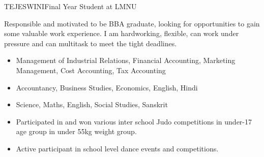 \documentclass{article}
\begin{document}
\begin{cv}[avatar]{TEJESWINI}{Final Year Student at LMNU}



Responsible and motivated to be BBA graduate, looking for opportunities to gain some valuable work experience.
I am hardworking, flexible, can work under pressure and can multitask to meet the tight deadlines. \\



\begin{cvevent}[2020][present]
    \begin{itemize}
    	\item{Management of Industrial Relations, Financial Accounting, Marketing Management, Cost Accounting, Tax Accounting\\}
    \end{itemize}
    \begin{itemize}
    \item{Accountancy, Business Studies, Economics, English, Hindi \\ }
	\end{itemize}
     \begin{itemize}
    \item{Science, Maths, English, Social Studies, Sanskrit\\}
	\end{itemize}

\end{cvevent}



\begin{cvevent}[2017][2018]
    \begin{itemize}
        \item Participated in and won various inter school Judo competitions in under-17 age group in under 55kg weight group.
    \end{itemize}
    \begin{itemize}
    	\item Active participant in school level dance events and competitions.\\
    \end{itemize}
\end{cvevent}



\end{cv}
\end{document}
